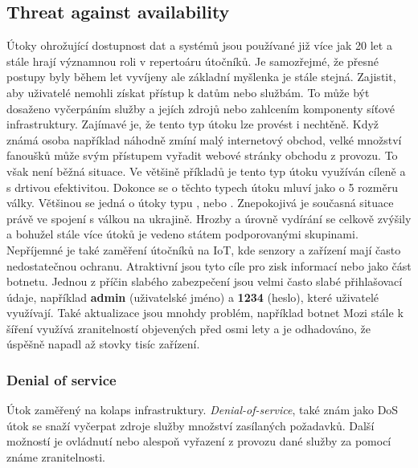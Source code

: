 \subsection{Threat against availability}\label{subsec:threat-against-availability}
Útoky ohrožující dostupnost dat a systémů jsou používané již více jak 20 let a stále hrají významnou roli v repertoáru útočníků.
Je samozřejmé, že přesné postupy byly během let vyvíjeny ale základní myšlenka je stále stejná.
Zajistit, aby uživatelé nemohli získat přístup k datům nebo službám.
To může být dosaženo vyčerpáním služby a jejích zdrojů nebo zahlcením komponenty síťové infrastruktury.
Zajímavé je, že tento typ útoku lze provést i nechtěně.
Když známá osoba například náhodně zmíní malý internetový obchod, velké množství fanoušků může svým přístupem vyřadit webové stránky obchodu z provozu.
To však není běžná situace.
Ve většině příkladů je tento typ útoku využíván cíleně a s drtivou efektivitou.
Dokonce se o těchto typech útoku mluví jako o 5 rozměru války.
Většinou se jedná o útoky typu ,  nebo .
Znepokojivá je současná situace právě ve spojení s válkou na ukrajině.
Hrozby a úrovně vydírání se celkově zvýšily a bohužel stále více útoků je vedeno státem podporovanými skupinami.
Nepříjemné je také zaměření útočníků na \ac{IoT}, kde senzory a zařízení mají často nedostatečnou ochranu.
Atraktivní jsou tyto cíle pro zisk informací nebo jako část botnetu.
Jednou z příčin slabého zabezpečení jsou velmi často slabé přihlašovací údaje, například \textbf{admin} (uživatelské jméno) a \textbf{1234} (heslo), které uživatelé využívají.
Také aktualizace jsou mnohdy problém, například botnet Mozi stále k šíření využívá zranitelností objevených před osmi lety a je odhadováno, že úspěšně napadl až stovky tisíc zařízení.\cite{Enisa_thread_landscape}


\subsubsection{Denial of service}
Útok zaměřený na kolaps infrastruktury.
\textit{Denial-of-service}, také znám jako \ac{DoS} útok se snaží vyčerpat zdroje služby množství zasílaných požadavků.
Další možností je ovládnutí nebo alespoň vyřazení z provozu dané služby za pomocí známe zranitelnosti.\cite{cisco_most_common_attack}


